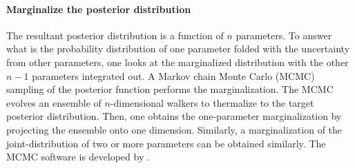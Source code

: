 \paragraph{Marginalize the posterior distribution} The resultant posterior distribution is a function of $n$ parameters.
To answer what is the probability distribution of one parameter folded with the uncertainty from other parameters, one looks at the marginalized distribution with the other $n-1$ parameters integrated out.
A Markov chain Monte Carlo (MCMC) sampling of the posterior function performs the marginalization.
The MCMC evolves an ensemble of $n$-dimensional walkers to thermalize to the target posterior distribution.
Then, one obtains the one-parameter marginalization by projecting the ensemble onto one dimension.
Similarly, a marginalization of the joint-distribution of two or more parameters can be obtained similarly.
The MCMC software is developed by \cite{emcee}.
